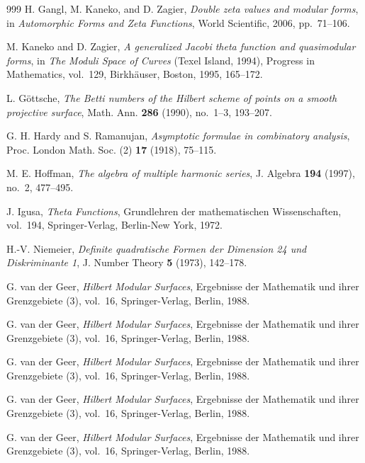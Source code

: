 \begin{thebibliography}{999}
H. Gangl, M. Kaneko, and D. Zagier, \emph{Double zeta values and modular forms}, in \emph{Automorphic Forms and Zeta Functions}, World Scientific, 2006, pp.~71--106.

M. Kaneko and D. Zagier, \emph{A generalized Jacobi theta function
and quasimodular forms}, in \emph{The Moduli Space of Curves}
(Texel Island, 1994), Progress in Mathematics, vol.~129,
Birkh\"auser, Boston, 1995, 165--172.

L. G\"ottsche, \emph{The Betti numbers of the Hilbert scheme of points on a smooth projective surface}, Math. Ann. \textbf{286} (1990), no.~1--3, 193--207.

G. H. Hardy and S. Ramanujan, \emph{Asymptotic formulae in combinatory analysis}, Proc. London Math. Soc. (2) \textbf{17} (1918), 75--115.

M. E. Hoffman, \emph{The algebra of multiple harmonic series}, J. Algebra \textbf{194} (1997), no.~2, 477--495.

J. Igusa, \emph{Theta Functions}, Grundlehren der mathematischen Wissenschaften, vol.~194, Springer-Verlag, Berlin-New York, 1972.

H.-V. Niemeier, \emph{Definite quadratische Formen der Dimension 24 und Diskriminante 1}, J. Number Theory \textbf{5} (1973), 142--178.

G. van der Geer, \emph{Hilbert Modular Surfaces}, Ergebnisse der Mathematik und ihrer Grenzgebiete (3), vol.~16, Springer-Verlag, Berlin, 1988.

G. van der Geer, \emph{Hilbert Modular Surfaces}, Ergebnisse der Mathematik und ihrer Grenzgebiete (3), vol.~16, Springer-Verlag, Berlin, 1988.

G. van der Geer, \emph{Hilbert Modular Surfaces}, Ergebnisse der Mathematik und ihrer Grenzgebiete (3), vol.~16, Springer-Verlag, Berlin, 1988.

G. van der Geer, \emph{Hilbert Modular Surfaces}, Ergebnisse der Mathematik und ihrer Grenzgebiete (3), vol.~16, Springer-Verlag, Berlin, 1988.

G. van der Geer, \emph{Hilbert Modular Surfaces}, Ergebnisse der Mathematik und ihrer Grenzgebiete (3), vol.~16, Springer-Verlag, Berlin, 1988.


\end{thebibliography}
